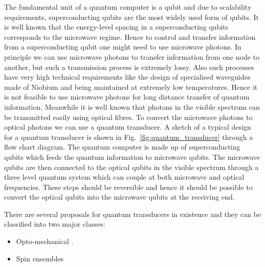 \documentclass[twocolumn, aps, rmp, amsmath, amssymb, nofootinbib, superscriptaddress, longbibliography, floatfix, table-of-contents, eqsecnum]{revtex4-1}
\begin{document}
The fundamental unit of a quantum computer is a qubit and due to scalability requirements, superconducting qubits are the most widely used form of qubits. It is well known that the energy-level spacing in a superconducting qubits corresponds to the microwave regime. Hence to control and transfer information from a superconducting qubit one might need to use microwave photons. In principle we can use microwave photons to transfer information from one node to another, but such a transmission process is extremely lossy. Also such processes have very high technical requirements like the design of specialised waveguides made of Niobium and being maintained at extremely low temperatures. Hence it is not feasible to use microwave photons for long distance transfer of quantum information. Meanwhile it is well known that photons in the visible spectrum can be transmitted easily using optical fibres. To convert the microwave photons to optical photons we can use a quantum transducer. A sketch of a typical design for a quantum transducer is shown in Fig.~\ref{fig:quantum_transducer} through a flow chart diagram. The quantum computer is made up of superconducting qubits which feeds the quantum information to microwave qubits. The microwave qubits are then connected to the optical qubits in the visible spectrum through a three level quantum system which can couple at both microwave and optical frequencies. These steps should be reversible and hence it should be possible to convert the optical qubits into the microwave qubits at the receiving end. 

There are several proposals for quantum transducers in existence and they can be classified into two major classes:
\begin{itemize}
	\item Opto-mechanical \cite{bib:rabl2010quantum, bib:barzanjeh2011entangling, bib:bochmann2013nanomechanical, bib:didier2014quantum, bib:schuetz2015universal, bib:shumeiko2016quantum, bib:stannigel2010optomechanical}.
	\item Spin ensembles \cite{bib:imamouglu2009cavity, bib:blum2015interfacing}
\end{itemize}
\end{document}
